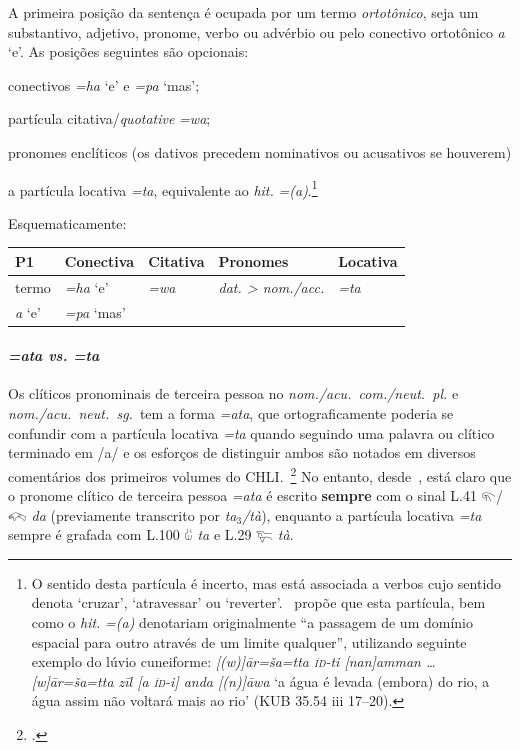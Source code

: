 A primeira posição da sentença é ocupada por um termo \emph{ortotônico},
seja um substantivo, adjetivo, pronome, verbo ou advérbio ou pelo conectivo
ortotônico \emph{a} `e'.
As posições seguintes são opcionais:
\begin{inparaenum}
	\item[2.] conectivos \emph{=ha} `e' e \emph{=pa} `mas';
	\item[3.] partícula citativa\slash{}\emph{quotative} \emph{=wa};
	\item[4.] pronomes enclíticos (os dativos precedem nominativos ou acusativos
	se houverem)
	\item[5.] a partícula locativa \emph{=ta}, equivalente ao \emph{hit.}
	\emph{={(a)}}.\footnote{O sentido desta partícula é
	incerto, mas está associada a verbos cujo sentido denota `cruzar',
	`atravessar' ou `reverter'.~\citet[419]{Josephson1972} propõe que esta partícula,
	bem como o \emph{hit.} \emph{={(a)}} denotariam originalmente
	``a passagem de um domínio espacial para outro através de um limite
	qualquer'', utilizando seguinte exemplo do lúvio cuneiforme:
	\emph{[(w)]ār=ša=tta \textsc{íd}-ti [nan]amman \ldots{} [w]ār=ša=tta zīl [a
	\textsc{íd}-i] anda [(n)]āwa} `a água é levada (embora) do rio, a água assim
	não voltará mais ao rio' (KUB 35.54 iii 17–20).
	}
\end{inparaenum}

Esquematicamente:

\begin{center}
	\begin{tabular}[c]{lllll}
		\toprule
		P1\emph{}    & Conectiva\emph{} & Citativa\emph{} & Pronomes\emph{}         & Locativa\emph{} \\
		\midrule
		\emph{}termo & \emph{=ha} `e'   & \emph{=wa}      & \emph{dat. > nom./acc.} & \emph{=ta}      \\
		\emph{a} `e' & \emph{=pa} `mas' & \emph{}         & \emph{}                 & \emph{}         \\
		\bottomrule
	\end{tabular}
\end{center}

\paragraph{\emph{=ata vs. =ta}}
Os clíticos pronominais de terceira pessoa no \emph{nom.\slash{}acu.\
	com.\slash{}neut.\ pl.} e \emph{nom.\slash{}acu.\ neut.\ sg.}\ tem a forma
\emph{=ata}, que ortograficamente poderia se confundir com a partícula locativa
\emph{=ta} quando seguindo uma palavra ou clítico terminado em /a/ e
os esforços de distinguir ambos são notados em diversos comentários dos
primeiros volumes do CHLI.~\footnote{\citet{CHLI11,CHLI12,CHLI13,CHLI2}.}
No entanto, desde~\citet{Rieken2008}, está claro que o pronome clítico de
terceira pessoa \emph{=ata} é escrito \textbf{sempre} com o sinal L.41
𔐬\slash{}𔐫 \emph{da} (previamente transcrito por \emph{ta$_3$\slash{}tà}),
enquanto a partícula locativa \emph{=ta} sempre é grafada com L.100 𔑰 \emph{ta} e
L.29 𔐞 \emph{tà}.


